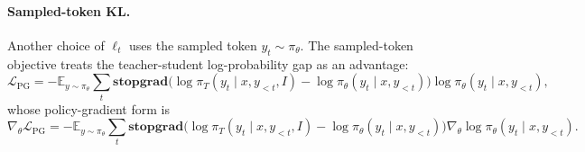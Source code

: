 \paragraph{Sampled-token KL.}
Another choice of $\ell_t$ uses the sampled token $y_t\sim\pi_\theta$.
The sampled-token objective treats the teacher-student log-probability gap as an advantage:
\begin{equation}
\mathcal L_{\mathrm{PG}}
=
-\mathbb E_{y\sim\pi_\theta}
\sum_t
\textbf{stopgrad}\big(\log\pi_T(y_t\mid x,y_{<t},I)
-\log\pi_\theta(y_t\mid x,y_{<t})\big)
\log\pi_\theta(y_t\mid x,y_{<t}),
\label{eq:policygrad_sampledtoken}
\end{equation}
whose policy-gradient form is
\begin{equation}
\nabla_\theta \mathcal L_{\mathrm{PG}}
=
-\mathbb E_{y\sim\pi_\theta}
\sum_t
\textbf{stopgrad}\big(\log\pi_T(y_t\mid x,y_{<t},I)
-\log\pi_\theta(y_t\mid x,y_{<t})\big)
\nabla_\theta\log\pi_\theta(y_t\mid x,y_{<t}).
\end{equation}
